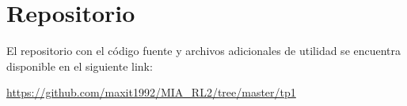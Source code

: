 
\chapter{Repositorio} %

\label{Repositorio}

El repositorio con el código fuente y archivos adicionales de utilidad se encuentra disponible en el siguiente link:

\url{https://github.com/maxit1992/MIA_RL2/tree/master/tp1}


